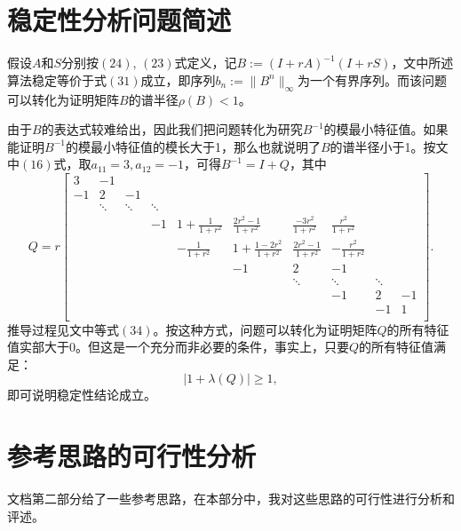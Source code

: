 \documentclass[UTF8]{ctexart}
\theoremstyle{plain}
\theoremstyle{definition}
\theoremstyle{remark}
\begin{document}
\section{稳定性分析问题简述}
假设$A$和$S$分别按$(24)$, $(23)$式定义，记$B:=(I+rA)^{-1}(I+rS)$，文中所述算法稳定等价于式$(31)$成立，即序列$b_{n}:=\|B^{n}\|_{\infty}$为一个有界序列。而该问题可以转化为证明矩阵$B$的谱半径$\rho(B)<1$。

由于$B$的表达式较难给出，因此我们把问题转化为研究$B^{-1}$的模最小特征值。如果能证明$B^{-1}$的模最小特征值的模长大于1，那么也就说明了$B$的谱半径小于1。按文中$(16)$式，取$a_{11}=3,a_{12}=-1$，可得$B^{-1}=I+Q$，其中
\begin{equation}
    Q=r\begin{bmatrix}
        3&-1& & & & & & & & \\
        -1&2&-1& & & & & & &\\
        &\ddots&\ddots&\ddots&&&&&&\\
         & & &-1&1+\frac{1}{1+r^2}&\frac{2r^2-1}{1+r^2}&\frac{-3r^2}{1+r^2}&\frac{r^2}{1+r^2}&&\\
         & & & &-\frac{1}{1+r^2}&1+\frac{1-2r^2}{1+r^2}&\frac{2r^2-1}{1+r^2}&-\frac{r^2}{1+r^2}& \\
         & & & & &-1&2&-1& & \\
         & & & & &  &\ddots&\ddots&\ddots& \\
         & & & & & & &-1&2&-1\\
         & & & & & & &  &-1&1\\
    \end{bmatrix}.
\end{equation}
推导过程见文中等式$(34)$。按这种方式，问题可以转化为证明矩阵$Q$的所有特征值实部大于0。但这是一个充分而非必要的条件，事实上，只要$Q$的所有特征值满足：
\begin{equation}
    |1+\lambda(Q)|\ge 1,
\end{equation}
即可说明稳定性结论成立。
\section{参考思路的可行性分析}
文档第二部分给了一些参考思路，在本部分中，我对这些思路的可行性进行分析和评述。
\end{document}
